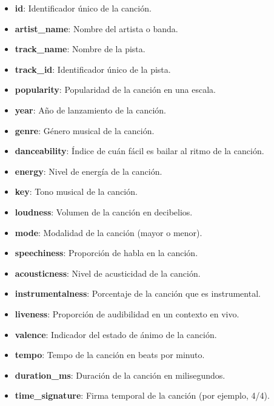 \documentclass[12pt]{article}
\begin{document}
\begin{flushleft}
                \begin{itemize}[left=4em]
                    \item \textbf{id}: Identificador único de la canción.
                    \item \textbf{artist\_name}: Nombre del artista o banda.
                    \item \textbf{track\_name}: Nombre de la pista.
                    \item \textbf{track\_id}: Identificador único de la pista.
                    \item \textbf{popularity}: Popularidad de la canción en una escala.
                    \item \textbf{year}: Año de lanzamiento de la canción.
                    \item \textbf{genre}: Género musical de la canción.
                    \item \textbf{danceability}: Índice de cuán fácil es bailar al ritmo de la canción.
                    \item \textbf{energy}: Nivel de energía de la canción.
                    \item \textbf{key}: Tono musical de la canción.
                    \item \textbf{loudness}: Volumen de la canción en decibelios.
                    \item \textbf{mode}: Modalidad de la canción (mayor o menor).
                    \item \textbf{speechiness}: Proporción de habla en la canción.
                    \item \textbf{acousticness}: Nivel de acusticidad de la canción.
                    \item \textbf{instrumentalness}: Porcentaje de la canción que es instrumental.
                    \item \textbf{liveness}: Proporción de audibilidad en un contexto en vivo.
                    \item \textbf{valence}: Indicador del estado de ánimo de la canción.
                    \item \textbf{tempo}: Tempo de la canción en beats por minuto.
                    \item \textbf{duration\_ms}: Duración de la canción en milisegundos.
                    \item \textbf{time\_signature}: Firma temporal de la canción (por ejemplo, 4/4).
                \end{itemize}
            

\end{flushleft}
\end{document}
